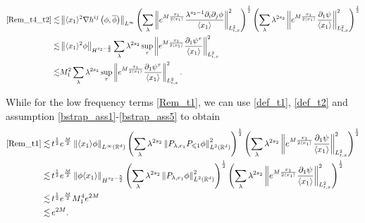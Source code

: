 \documentclass[10pt,twoside,a4paper]{article}
\numberwithin{equation}{section}\allowdisplaybreaks
\def\leq{\leqslant}
\begin{document}
\begin{align*}
	\eqref{Rem_t4_t2} \lesssim &\left\| \langle x_1 \rangle^2 \nabla  h^{ij}\left(\phi,\overline{\phi}\right) \right\|_{L^\infty}  \left(\sum_{\lambda} \left\| e^{M \frac{x_1}{2\langle x_1\rangle} } \frac{ \lambda^{ s_2-1}\partial_{i} \partial_j  \phi }{\langle x_1\rangle }  \right\|_{L^2_{t,x}}^2\right)^{\frac 12} \left(\sum_{\lambda} \lambda^{ 2s_2}\left\| e^{M \frac{x_1}{2\langle x_1\rangle} } \frac{\partial_1 \psi }{\langle x_1\rangle }  \right\|_{L^2_{t,x}}^2\right)^{\frac 12} \\
	\lesssim &  \left\|   \langle x_1 \rangle^2 \phi \right\|_{H^{s_2-\frac 32}}   \sum_{\lambda} \lambda^{ 2s_2}\sup_{\tau}\left\|e^{M \frac{x_1}{2\langle x_1\rangle} }  \frac{\partial_1 \psi^\tau  }{\langle x_1\rangle }  \right\|_{L^2_{t,x}}^2 \\
	\lesssim & M_1^2   \sum_{\lambda} \lambda^{ 2s_2}\sup_{\tau}\left\|e^{M \frac{x_1}{2\langle x_1\rangle} }  \frac{\partial_1 \psi^\tau  }{\langle x_1\rangle }  \right\|_{L^2_{t,x}}^2.
\end{align*}



While for the low frequency terms \eqref{Rem_t1}, we can use \eqref{def_t1}, \eqref{def_t2} and assumption \eqref{bstrap_ass1}-\eqref{bstrap_ass5} to obtain
\begin{align*}
	\eqref{Rem_t1}\lesssim &\, t^{\frac 12} e^{\frac M2} \left\|\langle x_1\rangle \phi \right\|_{L^{\infty}(\mathbb{R}^d)} \left(\sum_{\lambda} \lambda^{ 2s_2}\left\|  P_{\lambda,e_1} P_{\leq 1}  \phi\right\|_{L^{2}(\mathbb{R}^d)}^2 \right)^{\frac 12}\left(\sum_{\lambda} \lambda^{ 2s_2}\left\| e^{M \frac{x_1}{2\langle x_1\rangle} } \frac{\partial_1 \psi }{\langle x_1\rangle }  \right\|_{L^2_{t,x}}^2\right)^{\frac 12} \\
	\lesssim &\, t^{\frac 12} e^{\frac M2}    \left\|  \phi \langle x_1 \rangle\right\|_{H^{s_2-\frac 52}}    \left(\sum_{\lambda} \lambda^{ 2s_2}\left\|  P_{\lambda,e_1}    \phi\right\|_{L^{2}(\mathbb{R}^d)}^2 \right)^{\frac 12} \left(\sum_{\lambda} \lambda^{ 2s_2}\left\| e^{M \frac{x_1}{2\langle x_1\rangle} } \frac{\partial_1 \psi }{\langle x_1\rangle }  \right\|_{L^2_{t,x}}^2\right)^{\frac 12}  \\
	\lesssim & \,t^{\frac 12} e^{\frac M2}   M_1^4 e^{2M}\\
	\lesssim&\, e^{2M}.
\end{align*}
\end{document}
